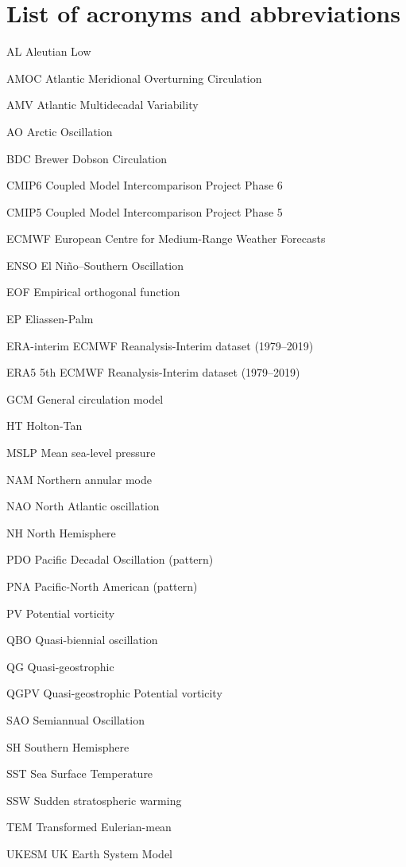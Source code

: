 \chapter*{List of acronyms and abbreviations}

\begin{description*}

\item[AL] Aleutian Low
\item[AMOC] Atlantic Meridional Overturning Circulation
\item[AMV] Atlantic Multidecadal Variability
\item[AO] Arctic Oscillation
\item[BDC] Brewer Dobson Circulation
\item[CMIP6] Coupled Model Intercomparison Project Phase 6
\item[CMIP5] Coupled Model Intercomparison Project Phase 5
\item[ECMWF] European Centre for Medium-Range Weather Forecasts
\item[ENSO] El Ni\~no--Southern Oscillation
\item[EOF] Empirical orthogonal function
\item[EP] Eliassen-Palm
\item[ERA-interim] ECMWF Reanalysis-Interim dataset (1979--2019)
\item[ERA5] 5th ECMWF Reanalysis-Interim dataset (1979--2019)
\item[GCM] General circulation model
\item[HT] Holton-Tan
\item[MSLP] Mean sea-level pressure
\item[NAM] Northern annular mode
\item[NAO] North Atlantic oscillation
\item[NH] North Hemisphere
\item[PDO] Pacific Decadal Oscillation (pattern)
\item[PNA] Pacific-North American (pattern)
\item[PV] Potential vorticity
\item[QBO] Quasi-biennial oscillation
\item[QG] Quasi-geostrophic
\item[QGPV] Quasi-geostrophic Potential vorticity
\item[SAO] Semiannual Oscillation
\item[SH] Southern Hemisphere
\item[SST] Sea Surface Temperature
\item[SSW] Sudden stratospheric warming
\item[TEM] Transformed Eulerian-mean
\item[UKESM] UK Earth System Model



\end{description*}
